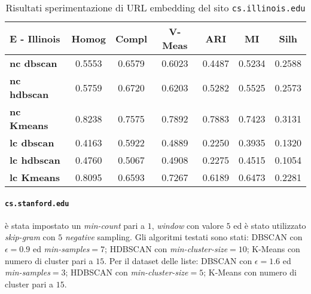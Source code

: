 \begin{table}[H]
	\begin{tabular}{| l | c | c | c | c | c | c |}
	\hline
	\textbf{E - Illinois}  & \textbf{Homog} & \textbf{Compl} & \textbf{V-Meas}  & \textbf{ARI}  & \textbf{MI}  & \textbf{Silh} \\ [3ex] 		\hline
	\textbf{nc dbscan} & 0.5553 & 0.6579 & 0.6023 & 0.4487 & 0.5234 & 0.2588\\ [3ex]
	 \hline 
	\textbf{nc hdbscan} & 0.5759 & 0.6720 & 0.6203 & 0.5282 & 0.5525 & 0.2573\\ [3ex]
	 \hline
	\textbf{nc Kmeans} & 0.8238 & 0.7575 & 0.7892 & 0.7883 & 0.7423 & 0.3131\\ [3ex]
	 \hline	
	\textbf{lc dbscan} & 0.4163 & 0.5922 & 0.4889 & 0.2250 & 0.3935 & 0.1320\\ [3ex]
	\hline
	\textbf{lc hdbscan} & 0.4760 & 0.5067 & 0.4908 & 0.2275 & 0.4515 & 0.1054\\ [3ex]
	\hline
	\textbf{lc Kmeans} & 0.8095 & 0.6593 & 0.7267 & 0.6189 & 0.6473 & 0.2281\\ [3ex]
	\hline
	\end{tabular}
	\caption{Risultati sperimentazione di URL embedding del sito \texttt{cs.illinois.edu}}
	\label{metricheEmbedIll}
\end{table}

\paragraph{\texttt{cs.stanford.edu}} è stata impostato un \textit{min-count} pari a $1$, \textit{window} con valore $5$ ed è stato utilizzato \textit{skip-gram} con $5$ \textit{negative} sampling. Gli algoritmi testati sono stati: DBSCAN con $\epsilon = 0.9$ ed \textit{min-samples}$ = 7$; HDBSCAN con \textit{min-cluster-size}$=10$; K-Means con numero di cluster pari a $15$. Per il dataset delle liste: DBSCAN con $\epsilon = 1.6$ ed \textit{min-samples}$ = 3$; HDBSCAN con \textit{min-cluster-size}$=5$; K-Means con numero di cluster pari a $15$.

